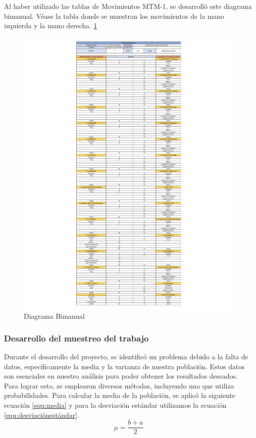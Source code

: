    Al haber utilizado las tablas de Movimientos MTM-1, se desarrolló este diagrama bimanual. Véase la tabla donde se muestran los movimientos de la mano izquierda y la mano derecha. \ref{fig:diagramaBimanual1} 
    \begin{figure}[H]
        \centering
        \includegraphics[scale=0.4]{3/Img/diagramaBimanual1.pdf}
        \caption{Diagrama Bimanual} 
        \label{fig:diagramaBimanual1}
    \end{figure}
    \subsubsection{Desarrollo del muestreo del trabajo}
    
    Durante el desarrollo del proyecto, se identificó un problema debido a la falta de datos, específicamente la media y la varianza de nuestra población. Estos datos son esenciales en nuestro análisis para poder obtener los resultados deseados.
    Para lograr esto, se emplearon diversos métodos, incluyendo uno que utiliza probabilidades. Para calcular la media de la población, se aplicó la siguiente ecuación \ref{equ:media} y para  la desviación estándar utilizamos la ecuación \ref{equ:desviaciónestándar}. 
    \begin{equation}
                \label{equ:media}
               \mu = \dfrac{b+a}{2}
            \end{equation}
        
